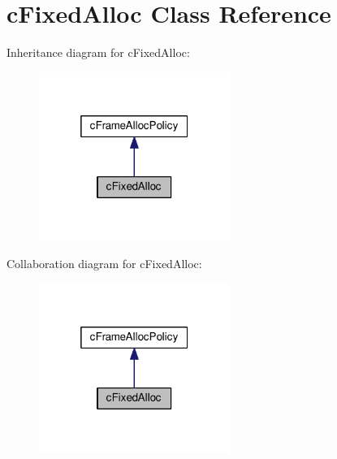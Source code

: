 \hypertarget{classcFixedAlloc}{\section{c\-Fixed\-Alloc \-Class \-Reference}
\label{d1/d40/classcFixedAlloc}
}


\-Inheritance diagram for c\-Fixed\-Alloc\-:\nopagebreak
\begin{figure}[H]
\begin{center}
\leavevmode
\includegraphics[width=176pt]{dc/d13/classcFixedAlloc__inherit__graph}
\end{center}
\end{figure}


\-Collaboration diagram for c\-Fixed\-Alloc\-:\nopagebreak
\begin{figure}[H]
\begin{center}
\leavevmode
\includegraphics[width=176pt]{d4/d27/classcFixedAlloc__coll__graph}
\end{center}
\end{figure}
